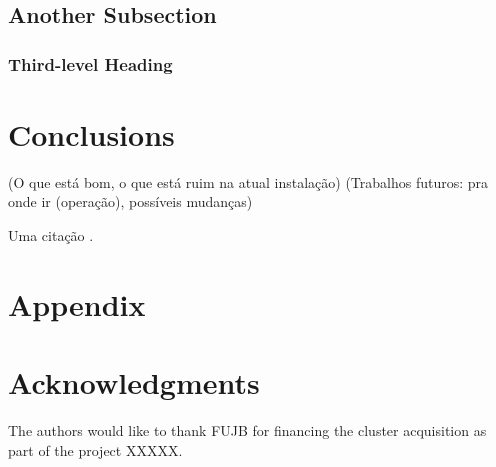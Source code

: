 \documentclass{anstrans}
\begin{document}
\subsection{Another Subsection}

\subsubsection{Third-level Heading}

\section{Conclusions}

(O que está bom, o que está ruim na atual instalação)
(Trabalhos futuros: pra onde ir (operação), possíveis mudanças)

Uma citação \cite{Henderson17}.

\appendix
\section{Appendix}

\section{Acknowledgments}
The authors would like to thank FUJB for financing the cluster acquisition
as part of the project XXXXX.


\end{document}
